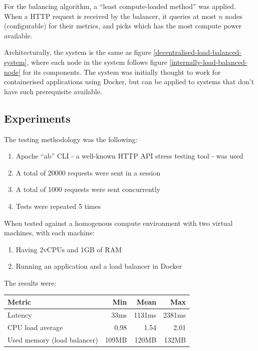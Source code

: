 \documentclass[conference]{IEEEtran}
\begin{document}
    For the balancing algorithm, a ``least compute-loaded method'' was applied. When a HTTP request is received by the
balancer, it queries at most $n$ nodes (configurable) for their metrics, and picks which has the most compute power available.
 
    Architecturally, the system is the same as figure \ref{decentralised-load-balanced-system}, where each node in the system
follows figure \ref{internally-load-balanced-node} for its components. The system was initially thought to work for containerised
applications using Docker, but can be applied to systems that don't have such prerequisite available.

\subsection{Experiments}

    The testing methodology was the following:

    \begin{enumerate}
        \item Apache ``ab'' CLI - a well-known HTTP API stress testing tool - was used
        \item A total of 20000 requests were sent in a session
        \item A total of 1000 requests were sent concurrently
        \item Tests were repeated 5 times
    \end{enumerate}

    When tested against a homogenous compute environment with two virtual machines, with each machine:

    \begin{enumerate}
        \item Having 2vCPUs and 1GB of RAM
        \item Running an application and a load balancer in Docker
    \end{enumerate}

    The results were:

    \begin{center}
        \centering
        \begin{tabular}{l|r|r|r}
            Metric & Min & Mean & Max \\
            \hline
            Latency & 33ms & 1131ms & 2381ms \\
            \hline
            CPU load average & 0.98 & 1.54 & 2.01 \\
            \hline
            Used memory (load balancer) & 109MB & 120MB & 132MB \\
        \end{tabular}
         \label{homogenous-nodes-metrics}
    \end{center}
\end{document}
